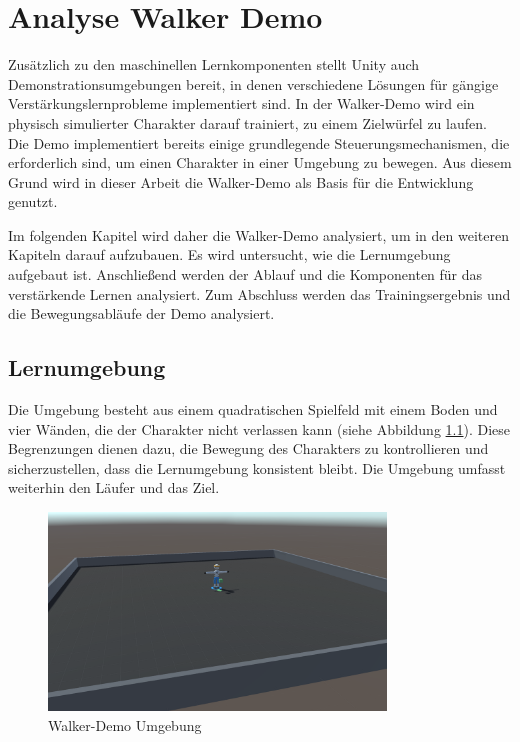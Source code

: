 \chapter{Analyse Walker Demo}
\label{sec:analyse}
Zusätzlich zu den maschinellen Lernkomponenten stellt Unity auch Demonstrationsumgebungen bereit, in denen verschiedene Lösungen für gängige Verstärkungslernprobleme implementiert sind. In der Walker-Demo wird ein physisch simulierter Charakter darauf trainiert, zu einem Zielwürfel zu laufen. Die Demo implementiert bereits einige grundlegende Steuerungsmechanismen, die erforderlich sind, um einen Charakter in einer Umgebung zu bewegen. Aus diesem Grund wird in dieser Arbeit die Walker-Demo als Basis für die Entwicklung genutzt. 

Im folgenden Kapitel wird daher die Walker-Demo analysiert, um in den weiteren Kapiteln darauf aufzubauen. Es wird untersucht, wie die Lernumgebung aufgebaut ist. Anschließend werden der Ablauf und die Komponenten für das verstärkende Lernen analysiert. Zum Abschluss werden das Trainingsergebnis und die Bewegungsabläufe der Demo analysiert.
\section{Lernumgebung}
Die Umgebung besteht aus einem quadratischen Spielfeld mit einem Boden und vier Wänden, die der Charakter nicht verlassen kann (siehe Abbildung \ref{fig:szene_demo}). Diese Begrenzungen dienen dazu, die Bewegung des Charakters zu kontrollieren und sicherzustellen, dass die Lernumgebung konsistent bleibt. Die Umgebung umfasst weiterhin den Läufer und das Ziel.

\begin{figure}[H]
  \centering  
  \includegraphics[width=0.8\textwidth]{img/szene_demo}
  \caption{Walker-Demo Umgebung}
  \label{fig:szene_demo}
\end{figure}

